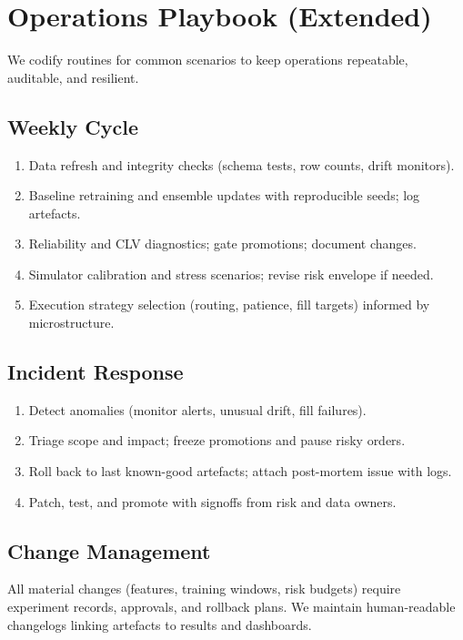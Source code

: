 \section{Operations Playbook (Extended)}\label{app:ops-playbook}
We codify routines for common scenarios to keep operations repeatable, auditable, and resilient.

\subsection{Weekly Cycle}
\begin{enumerate}
  \item Data refresh and integrity checks (schema tests, row counts, drift monitors).
  \item Baseline retraining and ensemble updates with reproducible seeds; log artefacts.
  \item Reliability and CLV diagnostics; gate promotions; document changes.
  \item Simulator calibration and stress scenarios; revise risk envelope if needed.
  \item Execution strategy selection (routing, patience, fill targets) informed by microstructure.
\end{enumerate}

\subsection{Incident Response}
\begin{enumerate}
  \item Detect anomalies (monitor alerts, unusual drift, fill failures).
  \item Triage scope and impact; freeze promotions and pause risky orders.
  \item Roll back to last known-good artefacts; attach post-mortem issue with logs.
  \item Patch, test, and promote with signoffs from risk and data owners.
\end{enumerate}

\subsection{Change Management}
All material changes (features, training windows, risk budgets) require experiment records, approvals, and rollback plans. We maintain human-readable changelogs linking artefacts to results and dashboards.

